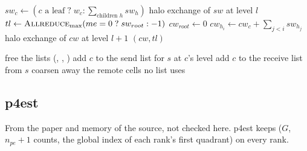 \begin{algorithm}[H]
  \caption{\textsc{ZWeights}$(w)$ (): the weight before each
    cell, through the tree}
  \label{alg:zweights}
  \begin{algorithmic}[1]
     
        \State $sw_c \gets (c \text{ a leaf} \; ? \; w_c : \sum_{\text{children
          } h} sw_h)$
      \EndFor
      \State halo exchange of $sw$ at level $l$
    \EndFor
    \State $tl \gets \textsc{Allreduce}_{\max}(me = 0 \; ? \; sw_{root} :
      -1)$ 
    \State $cw_{root} \gets 0$
     
        \State $cw_{h_i} \gets cw_c + \sum_{j<i} sw_{h_j}$
      \EndFor
      \State halo exchange of $cw$ at level $l+1$
    \EndFor
    \State \Return $(cw, tl)$
  \end{algorithmic}
\end{algorithm}

\begin{algorithm}[H]
  \caption{: the send and receive
    lists, from the pids}
  \label{alg:bas-buffers}
  \begin{algorithmic}[1]
    \State free the  lists (,
      , )
        \State add $c$ to the send list for $s$ at $c$'s level
      \EndIf
        \State add $c$ to the receive list from $s$
      \EndIf
    \EndFor
    \State coarsen away the remote cells no list uses
  \end{algorithmic}
\end{algorithm}

\subsection{p4est}

From the paper \cite{p4est} and memory of the source, not checked here.
p4est keeps  ($G$, $n_{pe}+1$ counts, the global
index of each rank's first quadrant) on every rank.

